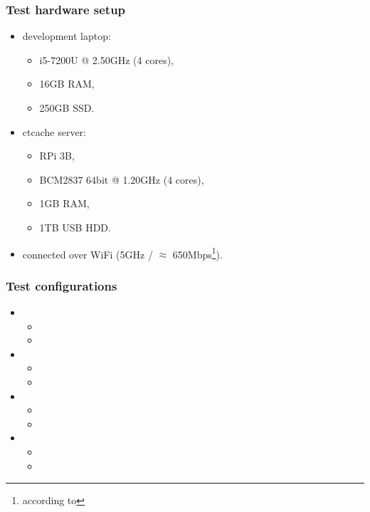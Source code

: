 \documentclass[compress,table,xcolor=table]{beamer}
\begin{document}
\begin{frame}
  \frametitle{Test hardware setup}
    \Large
    \begin{itemize}
    \item development laptop:
    \begin{itemize}
    \large
    \item i5-7200U @ 2.50GHz (4 cores),
    \item 16GB RAM,
    \item 250GB SSD.
    \end{itemize}
    \item ctcache server:
    \begin{itemize}
    \large
    \item RPi 3B,
    \item BCM2837 64bit @ 1.20GHz (4 cores),
    \item 1GB RAM,
    \item 1TB USB HDD.
    \end{itemize}
    \item connected over WiFi (5GHz / $\approx$ 650Mbps\footnote{
            according to }).
    \end{itemize}
\end{frame}
\begin{frame}
  \frametitle{Test configurations}
    \large
    \begin{itemize}
    \item {}
    \begin{itemize}
    \normalsize
    \item {}
    \item {}
    \end{itemize}
    \item {}
    \begin{itemize}
    \normalsize
    \item {}
    \item {}
    \end{itemize}
    \item {}
    \begin{itemize}
    \normalsize
    \item {}
    \item {}
    \end{itemize}
    \item {}
    \begin{itemize}
    \normalsize
    \item {}
    \item {}
    \end{itemize}
    \end{itemize}
\end{frame}
\end{document}
